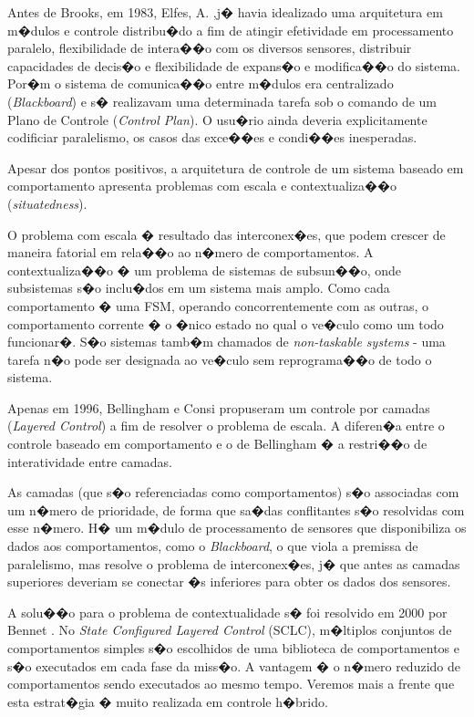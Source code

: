 Antes de Brooks, em 1983, Elfes, A. \cite{elfes1983distributed},j� havia
idealizado uma arquitetura em m�dulos e controle distribu�do a fim de atingir efetividade em processamento
paralelo, flexibilidade de intera��o com os diversos sensores, distribuir
capacidades de decis�o e flexibilidade de expans�o e modifica��o do sistema.
Por�m o sistema de comunica��o entre m�dulos era centralizado
(\emph{Blackboard}) e s� realizavam uma determinada tarefa sob o comando de um
Plano de Controle (\emph{Control Plan}). O usu�rio ainda deveria explicitamente
codificiar paralelismo, os casos das exce��es e condi��es inesperadas.

Apesar dos pontos positivos, a arquitetura de controle de um sistema
baseado em comportamento apresenta problemas com escala e contextualiza��o
(\emph{situatedness}). 

O problema com escala � resultado das interconex�es, que
podem crescer de maneira fatorial em rela��o ao n�mero de comportamentos. 
A contextualiza��o � um problema de sistemas de subsun��o, onde subsistemas s�o
inclu�dos em um sistema mais amplo. Como cada comportamento � uma FSM, operando
concorrentemente com as outras, o comportamento corrente � o �nico estado no
qual o ve�culo como um todo funcionar�. S�o sistemas tamb�m chamados de
\emph{non-taskable systems} - uma tarefa n�o pode ser designada ao
ve�culo sem reprograma��o de todo o sistema.  

Apenas em 1996, Bellingham e Consi \cite{bellingham1994second}
propuseram um controle por camadas (\emph{Layered Control}) a fim de resolver o
problema de escala. A diferen�a entre o controle baseado em comportamento e o de
Bellingham � a restri��o de interatividade entre camadas.

As camadas (que s�o referenciadas como comportamentos) s�o associadas com um n�mero de
prioridade, de forma que sa�das conflitantes s�o resolvidas com esse n�mero. H�
um m�dulo de processamento de sensores que disponibiliza os dados aos
comportamentos, como o \emph{Blackboard}, o que viola a premissa de
paralelismo, mas resolve o problema de interconex�es, j� que antes as camadas
superiores deveriam se conectar �s inferiores para obter os dados dos sensores.

A solu��o para o problema de contextualidade s� foi resolvido em 2000 por Bennet
\cite{bennett2000behavior}. No \emph{State Configured Layered Control} (SCLC),
m�ltiplos conjuntos de comportamentos simples s�o escolhidos de uma biblioteca
de comportamentos e s�o executados em cada fase da miss�o. A vantagem � o
n�mero reduzido de comportamentos sendo executados ao mesmo tempo. Veremos mais
a frente que esta estrat�gia � muito realizada em controle h�brido.

